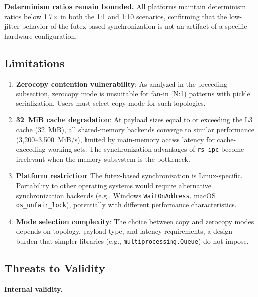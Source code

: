 \textbf{Determinism ratios remain bounded.} All platforms maintain determinism ratios below 1.7$\times$ in both the 1:1 and 1:10 scenarios, confirming that the low-jitter behavior of the futex-based synchronization is not an artifact of a specific hardware configuration.

\subsection{Limitations}

\begin{enumerate}
    \item \textbf{Zerocopy contention vulnerability}: As analyzed in the preceding subsection, zerocopy mode is unsuitable for fan-in (N:1) patterns with pickle serialization. Users must select copy mode for such topologies.

    \item \textbf{32~MiB cache degradation}: At payload sizes equal to or exceeding the L3 cache (32~MiB), all shared-memory backends converge to similar performance (3,200--3,500~MiB/s), limited by main-memory access latency for cache-exceeding working sets. The synchronization advantages of \texttt{rs\_ipc} become irrelevant when the memory subsystem is the bottleneck.

    \item \textbf{Platform restriction}: The futex-based synchronization is Linux-specific. Portability to other operating systems would require alternative synchronization backends (e.g., Windows \texttt{WaitOnAddress}, macOS \texttt{os\_unfair\_lock}), potentially with different performance characteristics.

    \item \textbf{Mode selection complexity}: The choice between copy and zerocopy modes depends on topology, payload type, and latency requirements, a design burden that simpler libraries (e.g., \texttt{multiprocessing.\allowbreak{}Queue}) do not impose.
\end{enumerate}

\subsection{Threats to Validity}
\label{subsec:threats_validity}

\textbf{Internal validity.}

